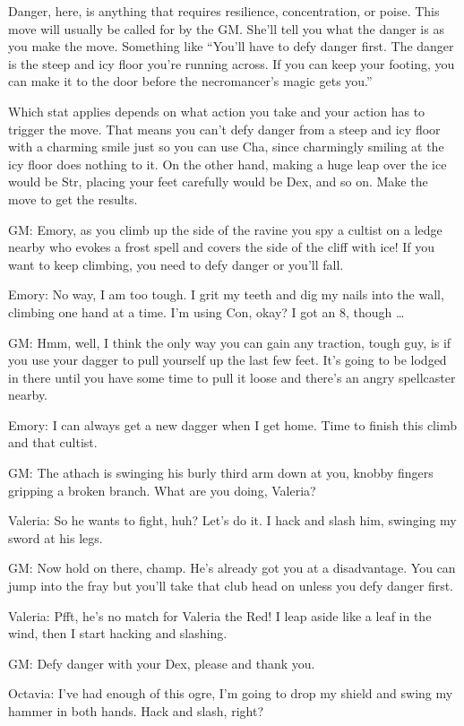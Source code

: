  Danger, here, is anything that requires resilience, concentration, or poise. This move will usually be called for by the GM. She'll tell you what the danger is as you make the move. Something like ``You'll have to defy danger first. The danger is the steep and icy floor you're running across. If you can keep your footing, you can make it to the door before the necromancer's magic gets you.''


 Which stat applies depends on what action you take and your action has to trigger the move. That means you can't defy danger from a steep and icy floor with a charming smile just so you can use Cha, since charmingly smiling at the icy floor does nothing to it. On the other hand, making a huge leap over the ice would be Str, placing your feet carefully would be Dex, and so on. Make the move to get the results.


 GM: Emory, as you climb up the side of the ravine you spy a cultist on a ledge nearby who evokes a frost spell and covers the side of the cliff with ice! If you want to keep climbing, you need to defy danger or you'll fall.


 Emory: No way, I am too tough. I grit my teeth and dig my nails into the wall, climbing one hand at a time. I'm using Con, okay? I got an 8, though \ldots 


 GM: Hmm, well, I think the only way you can gain any traction, tough guy, is if you use your dagger to pull yourself up the last few feet. It's going to be lodged in there until you have some time to pull it loose and there's an angry spellcaster nearby.


 Emory: I can always get a new dagger when I get home. Time to finish this climb and that cultist.


 GM: The athach is swinging his burly third arm down at you, knobby fingers gripping a broken branch. What are you doing, Valeria?


 Valeria: So he wants to fight, huh? Let's do it. I hack and slash him, swinging my sword at his legs.


 GM: Now hold on there, champ. He's already got you at a disadvantage. You can jump into the fray but you'll take that club head on unless you defy danger first.


 Valeria: Pfft, he's no match for Valeria the Red! I leap aside like a leaf in the wind, then I start hacking and slashing.


 GM: Defy danger with your Dex, please and thank you.


 Octavia: I've had enough of this ogre, I'm going to drop my shield and swing my hammer in both hands. Hack and slash, right?


